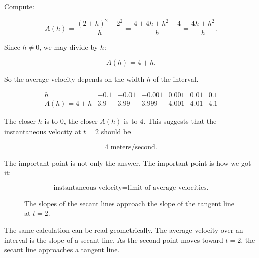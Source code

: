 Compute:

\[
A(h)
=
\frac{(2+h)^2-2^2}{h}
=
\frac{4+4h+h^2-4}{h}
=
\frac{4h+h^2}{h}.
\]

Since \(h\neq0\), we may divide by \(h\):

\[
A(h)=4+h.
\]

So the average velocity depends on the width \(h\) of the interval.

\[
\begin{array}{c|cccccc}
h & -0.1 & -0.01 & -0.001 & 0.001 & 0.01 & 0.1 \\ \hline
A(h)=4+h & 3.9 & 3.99 & 3.999 & 4.001 & 4.01 & 4.1
\end{array}
\]

The closer \(h\) is to \(0\), the closer \(A(h)\) is to \(4\).  This suggests that the instantaneous velocity at \(t=2\) should be

\[
4\text{ meters/second}.
\]

The important point is not only the answer.  The important point is how we got it:

\[
\text{instantaneous velocity}=\text{limit of average velocities.}
\]

\begin{figure}[h]
\centering
{}
\caption{The slopes of the secant lines approach the slope of the tangent line at \(t=2\).}
\label{fig:secants-approach-tangent}
\end{figure}

The same calculation can be read geometrically.  The average velocity over an interval is the slope of a secant line.  As the second point moves toward \(t=2\), the secant line approaches a tangent line.


